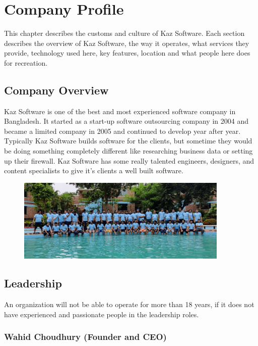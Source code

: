 \chapter{Company Profile}

This chapter describes the customs and culture of Kaz Software.
Each section describes the overview of Kaz Software, the way it operates, what services they provide, technology used here, key features, location and what people here does for recreation. 

\section{Company Overview}

Kaz Software is one of the best and most experienced software company in Bangladesh.
It started as a start-up software outsourcing company in 2004 and became a limited company in 2005 and continued to develop year after year.
Typically Kaz Software builds software for the clients, but sometime they would be doing something completely different like researching business data or setting up their firewall.
Kaz Software has some really talented engineers, designers, and content specialists to give it's clients a well built software.

\begin{figure}[h]
    \begin{center}
        \includegraphics[width=0.9\textwidth]{images/Chapter2/cto_tour.jpg}
        \label{fig:CTO_Tour}
    \end{center}
\end{figure}

\section{Leadership}

An organization will not be able to operate for more than 18 years, if it does not have experienced and passionate people in the leadership roles.

\subsection[Founder and CEO]{Wahid Choudhury (Founder and CEO)}

